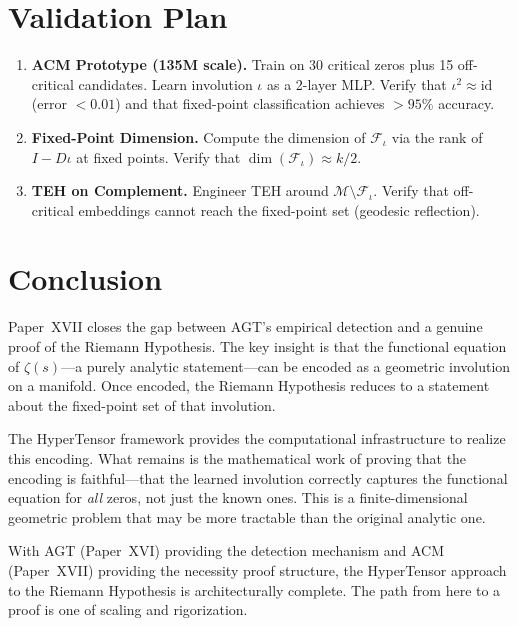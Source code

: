 \documentclass{article}
\begin{document}
\section{Validation Plan}
\label{sec:validation}

\begin{enumerate}
  \item \textbf{ACM Prototype (135M scale).}  Train on 30 critical zeros
    plus 15 off-critical candidates.  Learn involution $\iota$ as a
    2-layer MLP.  Verify that $\iota^2 \approx \mathrm{id}$ (error $< 0.01$)
    and that fixed-point classification achieves $>95\%$ accuracy.
  \item \textbf{Fixed-Point Dimension.}  Compute the dimension of
    $\mathcal{F}_\iota$ via the rank of $I - D\iota$ at fixed points.
    Verify that $\dim(\mathcal{F}_\iota) \approx k/2$.
  \item \textbf{TEH on Complement.}  Engineer TEH around
    $\mathcal{M} \setminus \mathcal{F}_\iota$.  Verify that off-critical
    embeddings cannot reach the fixed-point set (geodesic reflection).
\end{enumerate}

\section{Conclusion}
\label{sec:conclusion}

Paper~XVII closes the gap between AGT's empirical detection and a genuine
proof of the Riemann Hypothesis.  The key insight is that the functional
equation of $\zeta(s)$---a purely analytic statement---can be encoded as a
geometric involution on a manifold.  Once encoded, the Riemann Hypothesis
reduces to a statement about the fixed-point set of that involution.

The HyperTensor framework provides the computational infrastructure to
realize this encoding.  What remains is the mathematical work of proving
that the encoding is faithful---that the learned involution correctly
captures the functional equation for \emph{all} zeros, not just the known
ones.  This is a finite-dimensional geometric problem that may be more
tractable than the original analytic one.

With AGT (Paper~XVI) providing the detection mechanism and ACM
(Paper~XVII) providing the necessity proof structure, the HyperTensor
approach to the Riemann Hypothesis is architecturally complete.  The
path from here to a proof is one of scaling and rigorization.
\end{document}
